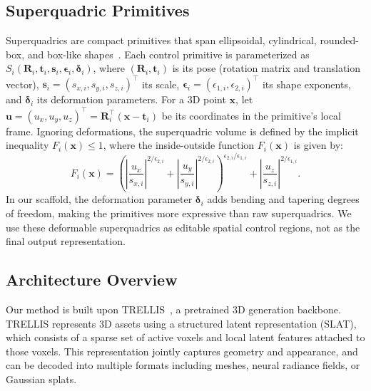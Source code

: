 \subsection{Superquadric Primitives}
\label{sec:superquadric_primitives}
Superquadrics are compact primitives that span ellipsoidal, cylindrical, rounded-box, and box-like shapes~\cite{1673799}. Each control primitive is parameterized as $S_i(\mathbf{R}_i,\mathbf{t}_i,\mathbf{s}_i,\boldsymbol{\epsilon}_i,\boldsymbol{\delta}_i)$, where $(\mathbf{R}_i,\mathbf{t}_i)$ is its pose (rotation matrix and translation vector), $\mathbf{s}_i = (s_{x,i}, s_{y,i}, s_{z,i})^\top$ its scale, $\boldsymbol{\epsilon}_i = (\epsilon_{1,i}, \epsilon_{2,i})^\top$ its shape exponents, and $\boldsymbol{\delta}_i$ its deformation parameters.
For a 3D point $\mathbf{x}$, let $\mathbf{u} = (u_x, u_y, u_z)^\top = \mathbf{R}_i^\top(\mathbf{x}-\mathbf{t}_i)$ be its coordinates in the primitive's local frame. Ignoring deformations, the superquadric volume is defined by the implicit inequality $F_i(\mathbf{x})\leq 1$, where the inside-outside function $F_i(\mathbf{x})$ is given by:
\vspace{-3mm}
\begin{equation}
F_i(\mathbf{x}) = \left( \left|\frac{u_x}{s_{x,i}}\right|^{2/\epsilon_{2,i}} + \left|\frac{u_y}{s_{y,i}}\right|^{2/\epsilon_{2,i}} \right)^{\epsilon_{2,i}/\epsilon_{1,i}} + \left|\frac{u_z}{s_{z,i}}\right|^{2/\epsilon_{1,i}} .
\label{eq:superquadric_implicit}
\end{equation}
In our scaffold, the deformation parameter $\boldsymbol{\delta}_i$ adds bending and tapering degrees of freedom, making the primitives more expressive than raw superquadrics. We use these deformable superquadrics as editable spatial control regions, not as the final output representation.



\subsection{Architecture Overview}

Our method is built upon TRELLIS~\cite{Xiang_2025_CVPR}, a pretrained 3D generation backbone. TRELLIS represents 3D assets using a structured latent representation (SLAT), which consists of a sparse set of active voxels and local latent features attached to those voxels. This representation jointly captures geometry and appearance, and can be decoded into multiple formats including meshes, neural radiance fields, or Gaussian splats.

